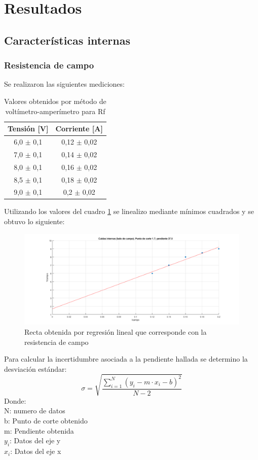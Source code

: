\documentclass[11pt,letterpaper]{article}     %
\begin{document}
\section{Resultados}
\subsection{Características internas}
\subsubsection{Resistencia de campo}
Se realizaron las siguientes mediciones:
\begin{table}[H]
	\centering
	\caption{Valores obtenidos por método de voltímetro-amperímetro para Rf}
	\label{VoltimetroAmperimetroRf}
	\begin{tabular}{|c|c|}
		\hline
		\textbf{Tensión {[}V{]}} & \textbf{Corriente {[}A{]}} \\ \hline
		6,0 $\pm$ 0,1            & 0,12 $\pm$ 0,02            \\ \hline
		7,0 $\pm$ 0,1            & 0,14 $\pm$ 0,02            \\ \hline
		8,0 $\pm$ 0,1            & 0,16 $\pm$ 0,02            \\ \hline
		8,5 $\pm$ 0,1            & 0,18 $\pm$ 0,02            \\ \hline
		9,0 $\pm$ 0,1            & 0,2 $\pm$ 0,02             \\ \hline
	\end{tabular}
\end{table}
Utilizando los valores del cuadro \ref{VoltimetroAmperimetroRf} se linealizo mediante mínimos cuadrados y se obtuvo lo siguiente:
\begin{figure}[H]
	\centering
	\includegraphics[scale=0.5]{./recursos-Lab6/caidasInternasCAMPO.png}
	\caption{Recta obtenida por regresión lineal que corresponde con la resistencia de campo}
	\label{fig:rectaResistenciaCampo}
\end{figure}
Para calcular la incertidumbre asociada a la pendiente hallada se determino la desviación estándar:
\begin{equation}
	\sigma = \sqrt{\frac{\sum_{i=1}^{N}(y_{i}-m\cdot x_{i}-b)^{2}}{N-2}} \label{desvEstandar}
\end{equation}
Donde:\\
N: numero de datos\\
b: Punto de corte obtenido\\
m: Pendiente obtenida\\
$y_{i}$: Datos del eje y\\
$x_{i}$: Datos del eje x
\end{document}
